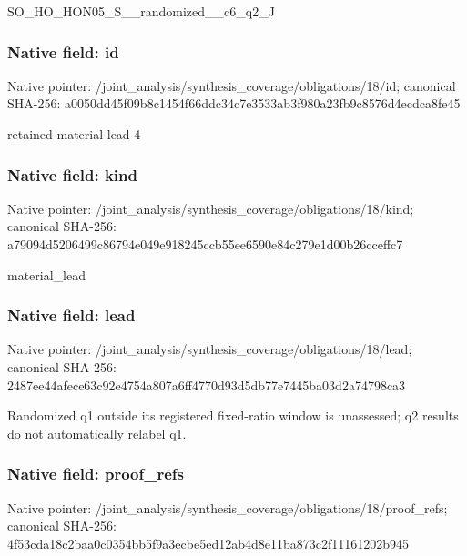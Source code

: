 \documentclass[10pt,a4paper]{article}
\begin{document}
\begingroup\raggedright\sloppy SO\_\allowbreak{}HO\_\allowbreak{}HON05\_\allowbreak{}S\_\allowbreak{}\_\allowbreak{}randomized\_\allowbreak{}\_\allowbreak{}c6\_\allowbreak{}q2\_\allowbreak{}J\par\endgroup

\subsubsection{Native field: id}
Native pointer: /joint\_\allowbreak{}analysis/synthesis\_\allowbreak{}coverage/obligations/18/id; canonical SHA-256: a0050dd45f09b8c1454f66ddc34c7e3533ab3f980a23fb9c8576d4ecdca8fe45

\begingroup\raggedright\sloppy retained-material-lead-4\par\endgroup

\subsubsection{Native field: kind}
Native pointer: /joint\_\allowbreak{}analysis/synthesis\_\allowbreak{}coverage/obligations/18/kind; canonical SHA-256: a79094d5206499c86794e049e918245ccb55ee6590e84c279e1d00b26cceffc7

\begingroup\raggedright\sloppy material\_\allowbreak{}lead\par\endgroup

\subsubsection{Native field: lead}
Native pointer: /joint\_\allowbreak{}analysis/synthesis\_\allowbreak{}coverage/obligations/18/lead; canonical SHA-256: 2487ee44afece63c92e4754a807a6ff4770d93d5db77e7445ba03d2a74798ca3

\begingroup\raggedright\sloppy Randomized q1 outside its registered fixed-ratio window is unassessed;\allowbreak{} q2 results do not automatically relabel q1.\par\endgroup

\subsubsection{Native field: proof\_\allowbreak{}refs}
Native pointer: /joint\_\allowbreak{}analysis/synthesis\_\allowbreak{}coverage/obligations/18/proof\_\allowbreak{}refs; canonical SHA-256: 4f53cda18c2baa0c0354bb5f9a3ecbe5ed12ab4d8e11ba873c2f11161202b945
\end{document}
